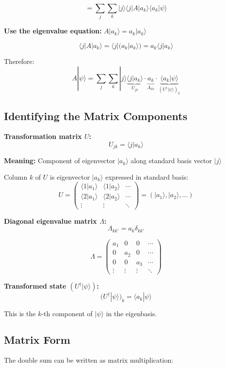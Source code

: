 \documentclass[11pt,a4paper]{article}
\begin{document}
$$= \sum_j \sum_k |j\rangle\langle j|A|a_k\rangle\langle a_k|\psi\rangle$$

\textbf{Use the eigenvalue equation:} $A|a_k\rangle = a_k|a_k\rangle$

$$\langle j|A|a_k\rangle = \langle j|(a_k|a_k\rangle) = a_k\langle j|a_k\rangle$$

Therefore:
$$\boxed{A|\psi\rangle = \sum_j \sum_k |j\rangle \underbrace{\langle j|a_k\rangle}_{U_{jk}} \cdot \underbrace{a_k}_{\Lambda_{kk}} \cdot \underbrace{\langle a_k|\psi\rangle}_{(U^\dagger|\psi\rangle)_k}}$$

\subsection*{Identifying the Matrix Components}

\textbf{Transformation matrix $U$:}
$$U_{jk} = \langle j|a_k\rangle$$

\textbf{Meaning:} Component of eigenvector $|a_k\rangle$ along standard basis vector $|j\rangle$

Column $k$ of $U$ is eigenvector $|a_k\rangle$ expressed in standard basis:
$$U = \begin{pmatrix}
\langle 1|a_1\rangle & \langle 1|a_2\rangle & \cdots \\
\langle 2|a_1\rangle & \langle 2|a_2\rangle & \cdots \\
\vdots & \vdots & \ddots
\end{pmatrix} = (|a_1\rangle, |a_2\rangle, \ldots)$$

\textbf{Diagonal eigenvalue matrix $\Lambda$:}
$$\Lambda_{kk'} = a_k \delta_{kk'}$$

$$\Lambda = \begin{pmatrix}
a_1 & 0 & 0 & \cdots \\
0 & a_2 & 0 & \cdots \\
0 & 0 & a_3 & \cdots \\
\vdots & \vdots & \vdots & \ddots
\end{pmatrix}$$

\textbf{Transformed state $(U^\dagger|\psi\rangle)$:}
$$(U^\dagger|\psi\rangle)_k = \langle a_k|\psi\rangle$$

This is the $k$-th component of $|\psi\rangle$ in the eigenbasis.

\subsection*{Matrix Form}

The double sum can be written as matrix multiplication:
\end{document}
